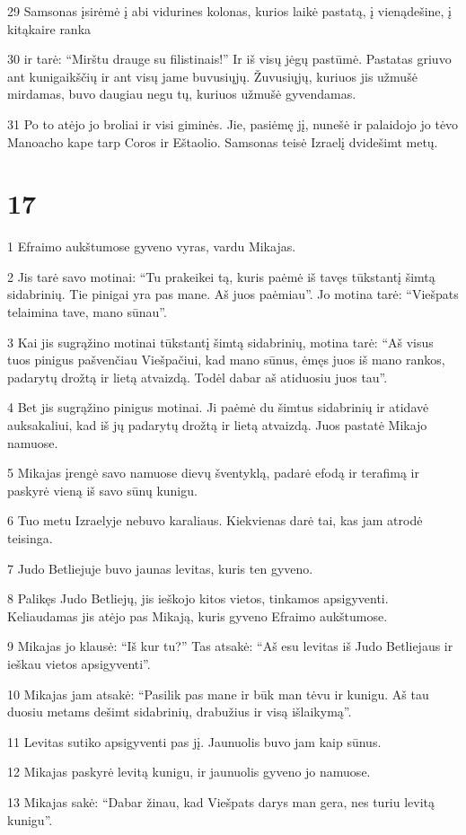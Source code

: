 \par 29 Samsonas įsirėmė į abi vidurines kolonas, kurios laikė pastatą, į vieną­dešine, į kitą­kaire ranka 
\par 30 ir tarė: “Mirštu drauge su filistinais!” Ir iš visų jėgų pastūmė. Pastatas griuvo ant kunigaikščių ir ant visų jame buvusiųjų. Žuvusiųjų, kuriuos jis užmušė mirdamas, buvo daugiau negu tų, kuriuos užmušė gyvendamas. 
\par 31 Po to atėjo jo broliai ir visi giminės. Jie, pasiėmę jį, nunešė ir palaidojo jo tėvo Manoacho kape tarp Coros ir Eštaolio. Samsonas teisė Izraelį dvidešimt metų.



\chapter{17}


\par 1 Efraimo aukštumose gyveno vyras, vardu Mikajas. 
\par 2 Jis tarė savo motinai: “Tu prakeikei tą, kuris paėmė iš tavęs tūkstantį šimtą sidabrinių. Tie pinigai yra pas mane. Aš juos paėmiau”. Jo motina tarė: “Viešpats telaimina tave, mano sūnau”. 
\par 3 Kai jis sugrąžino motinai tūkstantį šimtą sidabrinių, motina tarė: “Aš visus tuos pinigus pašvenčiau Viešpačiui, kad mano sūnus, ėmęs juos iš mano rankos, padarytų drožtą ir lietą atvaizdą. Todėl dabar aš atiduosiu juos tau”. 
\par 4 Bet jis sugrąžino pinigus motinai. Ji paėmė du šimtus sidabrinių ir atidavė auksakaliui, kad iš jų padarytų drožtą ir lietą atvaizdą. Juos pastatė Mikajo namuose. 
\par 5 Mikajas įrengė savo namuose dievų šventyklą, padarė efodą ir terafimą ir paskyrė vieną iš savo sūnų kunigu. 
\par 6 Tuo metu Izraelyje nebuvo karaliaus. Kiekvienas darė tai, kas jam atrodė teisinga. 
\par 7 Judo Betliejuje buvo jaunas levitas, kuris ten gyveno. 
\par 8 Palikęs Judo Betliejų, jis ieškojo kitos vietos, tinkamos apsigyventi. Keliaudamas jis atėjo pas Mikają, kuris gyveno Efraimo aukštumose. 
\par 9 Mikajas jo klausė: “Iš kur tu?” Tas atsakė: “Aš esu levitas iš Judo Betliejaus ir ieškau vietos apsigyventi”. 
\par 10 Mikajas jam atsakė: “Pasilik pas mane ir būk man tėvu ir kunigu. Aš tau duosiu metams dešimt sidabrinių, drabužius ir visą išlaikymą”. 
\par 11 Levitas sutiko apsigyventi pas jį. Jaunuolis buvo jam kaip sūnus. 
\par 12 Mikajas paskyrė levitą kunigu, ir jaunuolis gyveno jo namuose. 
\par 13 Mikajas sakė: “Dabar žinau, kad Viešpats darys man gera, nes turiu levitą kunigu”.



